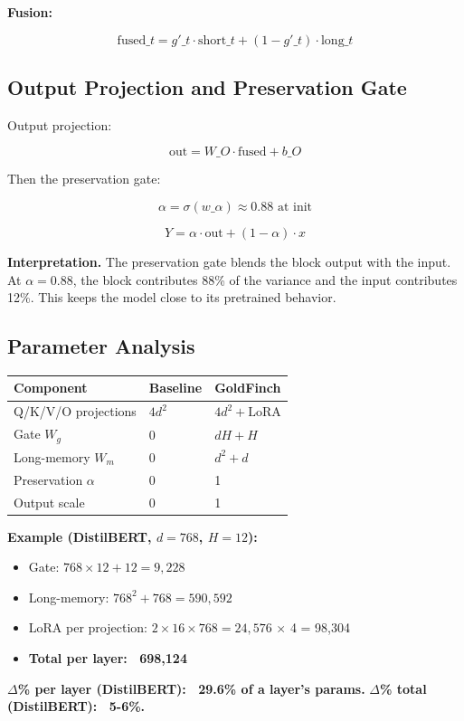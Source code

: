 \textbf{Fusion:}

\[
\text{fused}\_t = g'\_t \cdot \text{short}\_t + (1 - g'\_t) \cdot \text{long}\_t
\tag{4.8}
\]

\subsection{Output Projection and Preservation Gate}

Output projection:

\[
\text{out} = W\_O \cdot \text{fused} + b\_O
\tag{4.9}
\]

Then the preservation gate:

\[
\alpha = \sigma(w\_\alpha) \approx 0.88 \text{ at init}
\tag{4.10}
\]

\[
Y = \alpha \cdot \text{out} + (1 - \alpha) \cdot x
\tag{4.11}
\]

\textbf{Interpretation.} The preservation gate blends the block output with the 
input. At $\alpha = 0.88$, the block contributes 88\% of the variance and 
the input contributes 12\%. This keeps the model close to its pretrained 
behavior.

\subsection{Parameter Analysis}

\begin{table}[H]
\centering
\small
\begin{tabular}{lll}
\toprule
\textbf{Component} & \textbf{Baseline} & \textbf{GoldFinch} \\
\midrule
Q/K/V/O projections & $4 d^2$ & $4 d^2 + \text{LoRA}$ \\
Gate $W_g$ & 0 & $d H + H$ \\
Long-memory $W_m$ & 0 & $d^2 + d$ \\
Preservation $\alpha$ & 0 & 1 \\
Output scale & 0 & 1 \\
\bottomrule
\end{tabular}
\end{table}

\textbf{Example (DistilBERT, $d = 768$, $H = 12$):}
\begin{itemize}
\item Gate: $768 \times 12 + 12 = 9{,}228$
\item Long-memory: $768^2 + 768 = 590{,}592$
\item LoRA per projection: $2 \times 16 \times 768 = 24{,}576$ $\times$ 4 = 98,304
\item \textbf{Total per layer: ~698,124}

\end{itemize}
\textbf{$\Delta$\% per layer (DistilBERT): ~29.6\% of a layer's params.}
\textbf{$\Delta$\% total (DistilBERT): ~5-6\%.}


